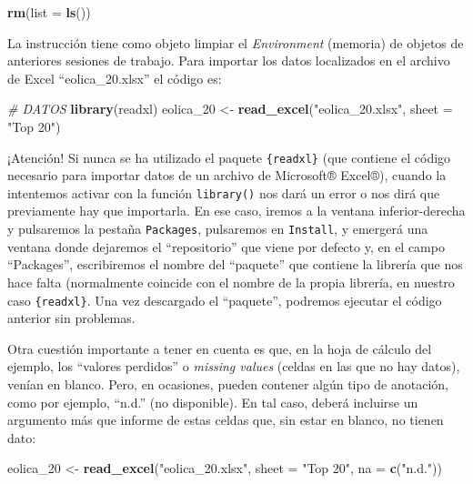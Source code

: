 \documentclass[
]{book}
\newenvironment{Shaded}{\begin{snugshade}}{\end{snugshade}}
\newcommand{\AttributeTok}[1]{\textcolor[rgb]{0.13,0.29,0.53}{#1}}
\newcommand{\CommentTok}[1]{\textcolor[rgb]{0.56,0.35,0.01}{\textit{#1}}}
\newcommand{\FunctionTok}[1]{\textcolor[rgb]{0.13,0.29,0.53}{\textbf{#1}}}
\newcommand{\NormalTok}[1]{#1}
\newcommand{\OtherTok}[1]{\textcolor[rgb]{0.56,0.35,0.01}{#1}}
\newcommand{\StringTok}[1]{\textcolor[rgb]{0.31,0.60,0.02}{#1}}
\begin{document}
\begin{Shaded}
\begin{Highlighting}[]
\FunctionTok{rm}\NormalTok{(}\AttributeTok{list =} \FunctionTok{ls}\NormalTok{())}
\end{Highlighting}
\end{Shaded}

La instrucción tiene como objeto limpiar el \emph{Environment} (memoria) de objetos de anteriores sesiones de trabajo. Para importar los datos localizados en el archivo de Excel ``eolica\_20.xlsx'' el código es:

\begin{Shaded}
\begin{Highlighting}[]
\CommentTok{\# DATOS}
\FunctionTok{library}\NormalTok{(readxl)}
\NormalTok{eolica\_20 }\OtherTok{\textless{}{-}} \FunctionTok{read\_excel}\NormalTok{(}\StringTok{"eolica\_20.xlsx"}\NormalTok{, }\AttributeTok{sheet =} \StringTok{"Top 20"}\NormalTok{)}
\end{Highlighting}
\end{Shaded}

¡Atención! Si nunca se ha utilizado el paquete \texttt{\{readxl\}} (que contiene el código necesario para importar datos de un archivo de Microsoft® Excel®), cuando la intentemos activar con la función \texttt{library()} nos dará un error o nos dirá que previamente hay que importarla. En ese caso, iremos a la ventana inferior-derecha y pulsaremos la pestaña \texttt{Packages}, pulsaremos en \texttt{Install}, y emergerá una ventana donde dejaremos el ``repositorio'' que viene por defecto y, en el campo ``Packages'', escribiremos el nombre del ``paquete'' que contiene la librería que nos hace falta (normalmente coincide con el nombre de la propia librería, en nuestro caso \texttt{\{readxl\}}. Una vez descargado el ``paquete'', podremos ejecutar el código anterior sin problemas.

Otra cuestión importante a tener en cuenta es que, en la hoja de cálculo del ejemplo, los ``valores perdidos'' o \emph{missing values} (celdas en las que no hay datos), venían en blanco. Pero, en ocasiones, pueden contener algún tipo de anotación, como por ejemplo, ``n.d.'' (no disponible). En tal caso, deberá incluirse un argumento más que informe de estas celdas que, sin estar en blanco, no tienen dato:

\begin{Shaded}
\begin{Highlighting}[]
\NormalTok{eolica\_20 }\OtherTok{\textless{}{-}} \FunctionTok{read\_excel}\NormalTok{(}\StringTok{"eolica\_20.xlsx"}\NormalTok{, }\AttributeTok{sheet =} \StringTok{"Top 20"}\NormalTok{, }\AttributeTok{na =} \FunctionTok{c}\NormalTok{(}\StringTok{"n.d."}\NormalTok{))}
\end{Highlighting}
\end{Shaded}
\end{document}
